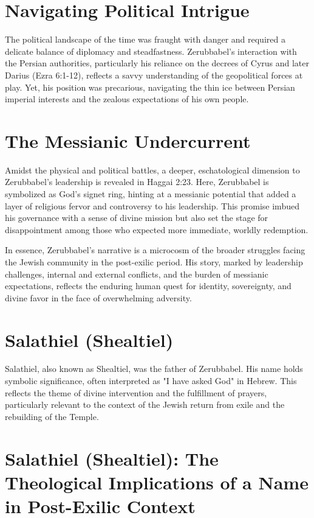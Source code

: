 \chapter{Navigating Political Intrigue}
The political landscape of the time was fraught with danger and required a delicate balance of diplomacy and steadfastness. Zerubbabel's interaction with the Persian authorities, particularly his reliance on the decrees of Cyrus and later Darius (Ezra 6:1-12), reflects a savvy understanding of the geopolitical forces at play. Yet, his position was precarious, navigating the thin ice between Persian imperial interests and the zealous expectations of his own people.

\chapter{The Messianic Undercurrent}
Amidst the physical and political battles, a deeper, eschatological dimension to Zerubbabel's leadership is revealed in Haggai 2:23. Here, Zerubbabel is symbolized as God's signet ring, hinting at a messianic potential that added a layer of religious fervor and controversy to his leadership. This promise imbued his governance with a sense of divine mission but also set the stage for disappointment among those who expected more immediate, worldly redemption.

In essence, Zerubbabel's narrative is a microcosm of the broader struggles facing the Jewish community in the post-exilic period. His story, marked by leadership challenges, internal and external conflicts, and the burden of messianic expectations, reflects the enduring human quest for identity, sovereignty, and divine favor in the face of overwhelming adversity.



\chapter{Salathiel (Shealtiel)}
Salathiel, also known as Shealtiel, was the father of Zerubbabel. His name holds symbolic significance, often interpreted as "I have asked God" in Hebrew. This reflects the theme of divine intervention and the fulfillment of prayers, particularly relevant to the context of the Jewish return from exile and the rebuilding of the Temple.

\chapter{Salathiel (Shealtiel): The Theological Implications of a Name in Post-Exilic Context}

